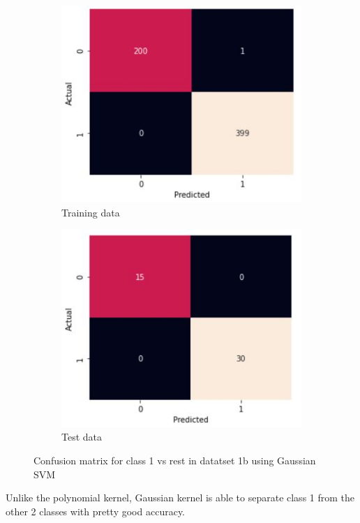 \documentclass[11pt]{article}
\begin{document}
\begin{figure}[h!]
\centering
	\begin{subfigure}[b]{0.45\textwidth}
	\centering
	\includegraphics[scale=0.5]{dataset1b_gauss_svm_1_cm_train.jpg}
	\caption{Training data}
	\label{fig:fig2.3.2.1}
	\end{subfigure}
	\begin{subfigure}[b]{0.45\textwidth}
	\centering
	\includegraphics[scale=0.5]{dataset1b_gauss_svm_1_cm_test.jpg}
	\caption{Test data}
	\label{fig:fig2.3.2.2}
	\end{subfigure}
\caption{Confusion matrix for class 1 vs rest in datatset 1b using Gaussian SVM}
\label{fig:fig2.3.2}
\end{figure}

Unlike the polynomial kernel, Gaussian kernel is able to separate class 1 from the other 2 classes with pretty good accuracy.
\end{document}
